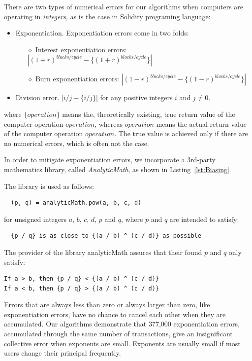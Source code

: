 \documentclass{article}
\begin{document}
There are two types of numerical errors for our algorithms 
when computers are operating in \textit{integers}, as is the case in Solidity programing language:
\begin{itemize}
  \item Exponentiation. 
  \newline Exponentiation errors come in two folds:
  \begin{itemize}
    \item[$\diamond$] Interest exponentiation errors: $|(1+r)^{blocks/cycle} - \{(1+r)^{blocks/cycle}\}|$
    \item[$\diamond$] Burn exponentiation errors: $|(1-r)^{blocks/cycle} - \{(1-r)^{blocks/cycle}\}|$
  \end{itemize}
  \item Division error.
  \newline
  $|i / j - \{i / j\}|$ for any positive integers $i$ and $j \neq 0$.
\end{itemize}
where $\{operation\}$ means the, theoretically existing, true return value of 
the computer operation $operation$, whereas $operation$ means the actual 
return value of the computer operation $operation$.
The true value is achieved only if there are no numerical errors, 
which is often not the case.
\newline

In order to mitigate exponentiation errors, 
we incorporate a 3rd-party mathematics library, 
called \textit{AnalyticMath}, as shown in Listing~\ref{lst:Biasing}.

The library is used as follows:
\begin{lstlisting}
  (p, q) = analyticMath.pow(a, b, c, d) 
\end{lstlisting}
for unsigned integers $a$, $b$, $c$, $d$, $p$ and $q$,
where $p$ and $q$ are intended to satisfy:
\begin{lstlisting}
  {p / q} is as close to {(a / b) ^ (c / d)} as possible
\end{lstlisting}
The provider of the library analyticMath assures that their 
found $p$ and $q$ only satisfy:
\begin{lstlisting}
If a > b, then {p / q} < {(a / b) ^ (c / d)}
If a < b, then {p / q} > {(a / b) ^ (c / d)}
\end{lstlisting}

Errors that are always less than zero or always larger than zero, 
like exponentiation errors, 
have no chance to cancel each other when they are accumulated.
Our algorithms demonstrate that 377,000 exponentiation errors, 
accumulated through the same number of transactions, 
give an insignificant collective error when exponents are small. 
Exponents are usually small if most users change their principal frequently.
\end{document}
